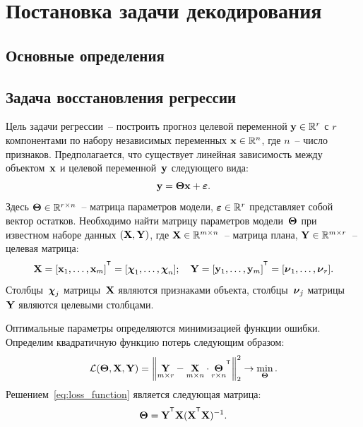 \chapter{Постановка задачи декодирования}


\section{Основные определения}

\section{Задача восстановления регрессии}

Цель задачи регрессии~-- построить прогноз целевой переменной $\mathbf{y} \in \mathbb{R}^r$ с $r$ компонентами по набору независимых переменных $\mathbf{x} \in \mathbb{R}^n$, где $n$~-- число признаков.
Предполагается, что существует линейная зависимость между объектом~$\mathbf{x}$ и целевой переменной~$\mathbf{y}$ следующего вида:
\begin{equation}
\mathbf{y} = \boldsymbol{\Theta} \mathbf{x}+ \boldsymbol{\varepsilon}.
\label{eq:model}
\end{equation}
Здесь $\boldsymbol{\Theta} \in \mathbb{R}^{r \times n}$~-- матрица параметров модели, $\boldsymbol{\varepsilon} \in \mathbb{R}^{r}$ представляет собой вектор остатков.
Необходимо найти матрицу параметров модели~$\boldsymbol{\Theta}$ при известном наборе данных $\left( \mathbf{X}, \mathbf{Y} \right)$, где $\mathbf{X} \in \mathbb{R}^{m \times n}$~-- матрица плана, $\mathbf{Y} \in \mathbb{R}^{m \times r}$~-- целевая матрица:
\begin{equation*}
\bX = [\bx_1, \dots, \bx_m]^{\T} =  [\bchi_1, \dots, \bchi_n]; \quad \bY = [\by_1, \dots, \by_m]^{\T} =  [\bnu_1, \dots, \bnu_r].
\end{equation*}
Столбцы~$\boldsymbol{\chi}_j$ матрицы~$\mathbf{X}$ являются признаками объекта, столбцы~$\boldsymbol{\nu}_j$ матрицы ~$\mathbf{Y}$ являются целевыми столбцами.

Оптимальные параметры определяются минимизацией функции ошибки.
Определим квадратичную функцию потерь следующим образом:
\begin{equation}
\cL(\bTheta, \bX, \bY) = {\left\| \underset{m \times r}{\mathbf{Y}}  - \underset{m \times n}{\bX} \cdot \underset{r \times n}{\bTheta}^{\T} \right\| }_2^2 \rightarrow\min_{\bTheta}.
\label{eq:loss_function}
\end{equation}
Решением~\eqref{eq:loss_function} является следующая матрица:
\begin{equation*}
\bTheta = \bY^{\T} \bX (\bX^{\T} \bX)^{-1}.
\end{equation*}

